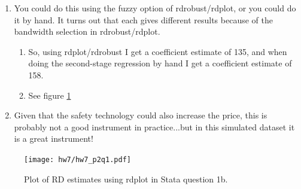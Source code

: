 \documentclass{article}
\begin{document}
\begin{enumerate}
    \item You could do this using the fuzzy option of rdrobust/rdplot, or you could do it by hand.  It turns out that each gives different results because of the bandwidth selection in rdrobust/rdplot.  
    \begin{enumerate}
    \item So, using rdplot/rdrobust I get a coefficient estimate of 135, and when doing the second-stage regression by hand I get a coefficient estimate of 158.
    \item See figure \ref{fig:rdplot}
    \end{enumerate}
    \item Given that the safety technology could also increase the price, this is probably not a good instrument in practice...but in this simulated dataset it is a great instrument!
\end{enumerate}

\begin{figure}
    \centering
    \texttt{[image: hw7/hw7\_p2q1.pdf]}
    \caption{Plot of RD estimates using rdplot in Stata question 1b.}
    \label{fig:rdplot}
\end{figure}
\end{document}

